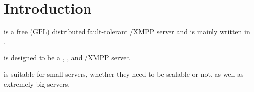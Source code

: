 \section{Introduction}
\label{sec:intr}


\ejabberd{} is a free (GPL) distributed fault-tolerant \Jabber{}/XMPP server and is mainly written in .

\ejabberd{} is designed to be a , , and  \Jabber{}/XMPP server.

\ejabberd{} is suitable for small servers, whether they need to be scalable or not, as well as extremely big servers.







